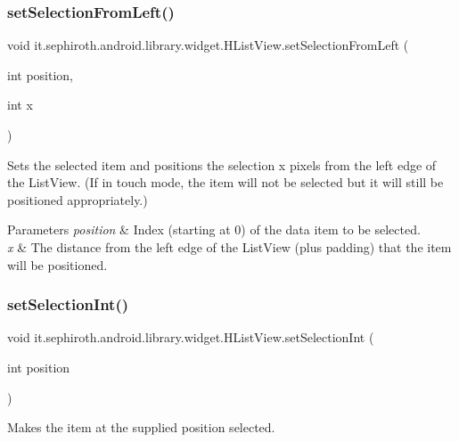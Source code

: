 \subsubsection{\texorpdfstring{set\+Selection\+From\+Left()}{setSelectionFromLeft()}}
{\footnotesize\ttfamily void it.\+sephiroth.\+android.\+library.\+widget.\+H\+List\+View.\+set\+Selection\+From\+Left (\begin{DoxyParamCaption}\item[{int}]{position,  }\item[{int}]{x }\end{DoxyParamCaption})}

Sets the selected item and positions the selection x pixels from the left edge of the List\+View. (If in touch mode, the item will not be selected but it will still be positioned appropriately.)


\begin{DoxyParams}{Parameters}
{\em position} & Index (starting at 0) of the data item to be selected. \\
\hline
{\em x} & The distance from the left edge of the List\+View (plus padding) that the item will be positioned. \\
\hline
\end{DoxyParams}
\mbox{\label{classit_1_1sephiroth_1_1android_1_1library_1_1widget_1_1_h_list_view_a0bce88ad74e3e76a681f52a4bc80d7ea}} 
\subsubsection{\texorpdfstring{set\+Selection\+Int()}{setSelectionInt()}}
{\footnotesize\ttfamily void it.\+sephiroth.\+android.\+library.\+widget.\+H\+List\+View.\+set\+Selection\+Int (\begin{DoxyParamCaption}\item[{int}]{position }\end{DoxyParamCaption})}

Makes the item at the supplied position selected.


